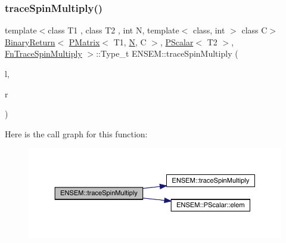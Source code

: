 \subsubsection{\texorpdfstring{traceSpinMultiply()}{traceSpinMultiply()}\hspace{0.1cm}{\footnotesize\ttfamily [2/3]}}
{\footnotesize\ttfamily template$<$class T1 , class T2 , int N, template$<$ class, int $>$ class C$>$ \\
\mbox{\hyperlink{structENSEM_1_1BinaryReturn}{Binary\+Return}}$<$ \mbox{\hyperlink{classENSEM_1_1PMatrix}{P\+Matrix}}$<$ T1, \mbox{\hyperlink{operator__name__util_8cc_a7722c8ecbb62d99aee7ce68b1752f337}{N}}, C $>$, \mbox{\hyperlink{classENSEM_1_1PScalar}{P\+Scalar}}$<$ T2 $>$, \mbox{\hyperlink{structENSEM_1_1FnTraceSpinMultiply}{Fn\+Trace\+Spin\+Multiply}} $>$\+::Type\+\_\+t E\+N\+S\+E\+M\+::trace\+Spin\+Multiply (\begin{DoxyParamCaption}\item[{const \mbox{\hyperlink{classENSEM_1_1PMatrix}{P\+Matrix}}$<$ T1, \mbox{\hyperlink{operator__name__util_8cc_a7722c8ecbb62d99aee7ce68b1752f337}{N}}, C $>$ \&}]{l,  }\item[{const \mbox{\hyperlink{classENSEM_1_1PScalar}{P\+Scalar}}$<$ T2 $>$ \&}]{r }\end{DoxyParamCaption})\hspace{0.3cm}{\ttfamily [inline]}}

Here is the call graph for this function\+:\nopagebreak
\begin{figure}[H]
\begin{center}
\leavevmode
\includegraphics[width=350pt]{df/d0a/group__primmatrix_gab5fbf23688b38c3209c80d2a9a22b3d0_cgraph}
\end{center}
\end{figure}
\mbox{\label{group__primmatrix_gafb9febbc048f38bb6e1dc7d60d8dde8d}} 

